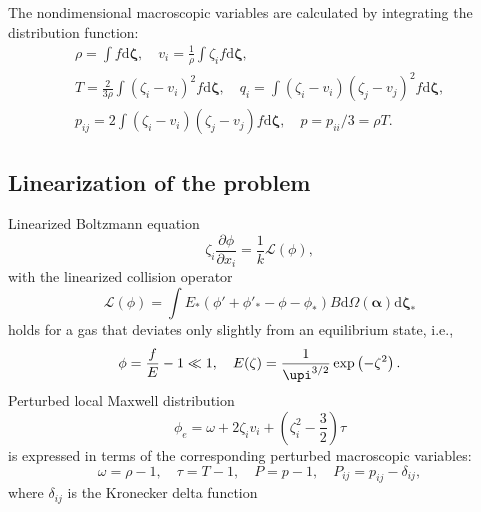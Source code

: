 \documentclass[]{jfm}
\newcommand{\dd}{\mathrm{d}}
\newcommand{\pder}[2][]{\frac{\partial#1}{\partial#2}}
\newcommand{\dzeta}{\boldsymbol{\dd\zeta}}
\begin{document}
The nondimensional macroscopic variables are calculated by integrating the distribution function:
\begin{equation}\label{eq:macro}
    \begin{gathered}
    \rho = \int f \dzeta, \quad
    v_i = \frac1{\rho} \int \zeta_i f \dzeta, \\
    T = \frac{2}{3\rho}\int(\zeta_i-v_i)^2 f \dzeta, \quad
    q_i = \int(\zeta_i-v_i)(\zeta_j-v_j)^2 f \dzeta, \\
    p_{ij} = 2 \int(\zeta_i-v_i)(\zeta_j-v_j) f \dzeta,
        \quad p = p_{ii}/3 = \rho T.
    \end{gathered}
\end{equation}

\subsection{Linearization of the problem}

Linearized Boltzmann equation
\begin{equation}\label{eq:linear_Boltzmann}
    \zeta_i \pder[\phi]{x_i} = \frac1k \mathcal{L}(\phi),
\end{equation}
with the linearized collision operator
\begin{equation}\label{eq:linear_ci}
    \mathcal{L}(\phi) = \int E_*(\phi'+\phi'_*-\phi-\phi_*) B
    \dd \Omega(\boldsymbol{\alpha}) \dzeta_*
\end{equation}
holds for a gas that deviates only slightly from an equilibrium state, i.e.,
\begin{equation}\label{eq:linear_condition}
    \phi = \frac{f}{E} - 1 \ll 1, \quad E(\zeta) = \frac1{\upi^{3/2}}\exp\left(-\zeta^2\right).
\end{equation}
Perturbed local Maxwell distribution
\begin{equation}\label{eq:linear_maxwellian}
    \phi_e = \omega + 2\zeta_i v_i + \left(\zeta_i^2-\frac32\right)\tau
\end{equation}
is expressed in terms of the corresponding perturbed macroscopic variables:
\begin{equation}
    \omega = \rho-1, \quad \tau = T-1, \quad P = p-1, \quad P_{ij} = p_{ij}-\delta_{ij},
\end{equation}
where \(\delta_{ij}\) is the Kronecker delta function
\end{document}
